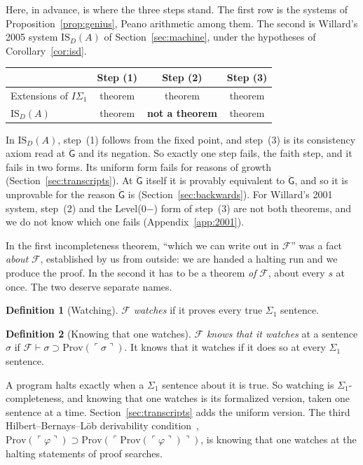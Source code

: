\documentclass[11pt]{article}
\newcommand{\F}{\mathcal{F}}
\newcommand{\G}{\ddot{\mathsf{G}}}          %
\newcommand{\Prov}{\mathrm{Prov}}
\newcommand{\gn}[1]{\ulcorner #1\urcorner}  %
\newcommand{\ISD}{\mathrm{IS}_D(A)}
\theoremstyle{plain}
\theoremstyle{definition}
\newtheorem*{definition}{Definition}
\begin{document}
Here, in advance, is where the three steps stand. The first row is the
systems of Proposition~\ref{prop:genius}, Peano arithmetic among them. The
second is Willard's 2005 system $\ISD$ of Section~\ref{sec:machine}, under
the hypotheses of Corollary~\ref{cor:isd}.

\begin{center}\small
\begin{tabular}{@{}lccc@{}}
\toprule
 & Step (1) & Step (2) & Step (3) \\
\midrule
Extensions of $I\Sigma_1$ & theorem & theorem & theorem \\
$\ISD$ & theorem & \textbf{not a theorem} & theorem \\
\bottomrule
\end{tabular}
\end{center}

\noindent
In $\ISD$, step~(1) follows from the fixed point, and step~(3) is its
consistency axiom read at $\G$ and its negation. So exactly one step fails,
the faith step, and it fails in two forms. Its uniform form fails for
reasons of growth (Section~\ref{sec:transcripts}). At $\G$ itself it is
provably equivalent to $\G$, and so it is unprovable for the reason $\G$ is
(Section~\ref{sec:backwards}). For Willard's 2001 system, step~(2) and the
Level(0$-$) form of step~(3) are not both theorems, and we do not know which
one fails (Appendix~\ref{app:2001}).

In the first incompleteness theorem, ``which we can write out in $\F$'' was a
fact \emph{about} $\F$, established by us from outside: we are handed a
halting run and we produce the proof. In the second it has to be a theorem
\emph{of} $\F$, about every $s$ at once. The two deserve separate names.

\begin{definition}[Watching]
$\F$ \emph{watches} if it proves every true $\Sigma_1$ sentence.
\end{definition}

\begin{definition}[Knowing that one watches]
$\F$ \emph{knows that it watches} at a sentence $\sigma$ if
$\F \vdash \sigma \supset \Prov(\gn{\sigma})$. It knows that it watches if it
does so at every $\Sigma_1$ sentence.
\end{definition}

\noindent
A program halts exactly when a $\Sigma_1$ sentence about it is true. So
watching is $\Sigma_1$-completeness, and knowing that one watches is its
formalized version, taken one sentence at a time. Section~\ref{sec:transcripts}
adds the uniform version. The third Hilbert--Bernays--Löb derivability
condition~\cite{hb39,lob55}, $\Prov(\gn{\varphi}) \supset
\Prov(\gn{\Prov(\gn{\varphi})})$, is knowing that one watches at the halting
statements of proof searches.
\end{document}
